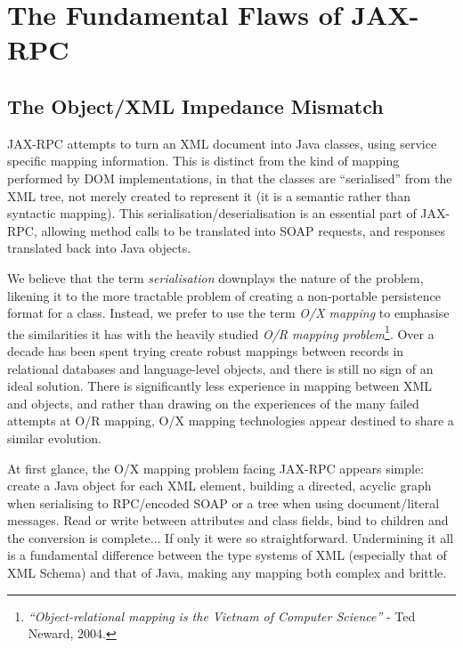 \section{The Fundamental Flaws of JAX-RPC}
\label{objections}

\subsection{The Object/XML Impedance Mismatch}
\label{objections:o-x}

JAX-RPC attempts to turn an XML document into Java classes, using
service specific mapping information. This is distinct from the kind
of mapping performed by DOM implementations, in that the classes are
``serialised'' from the XML tree, not merely created to represent it
(it is a semantic rather than syntactic mapping). This
serialisation/deserialisation is an essential part of JAX-RPC,
allowing method calls to be translated into SOAP requests, and
responses translated back into Java objects.

We believe that the term \emph{serialisation} downplays the nature of
the problem, likening it to the more tractable problem of creating a
non-portable persistence format for a class. Instead, we prefer to use
the term \emph{O/X mapping} to emphasise the similarities it has with
the heavily studied \emph{O/R mapping problem}\footnote{
\emph{``Object-relational mapping is the Vietnam of Computer Science''}
- Ted Neward, 2004.
}.  Over a decade has been spent trying create robust mappings between
records in relational databases and language-level objects, and there
is still no sign of an ideal solution. There is significantly less
experience in mapping between XML and objects, and rather than drawing
on the experiences of the many failed attempts at O/R mapping, O/X
mapping technologies appear destined to share a similar evolution.

At first glance, the O/X mapping problem facing JAX-RPC appears
simple: create a Java object for each XML element, building a
directed, acyclic graph when serialising to RPC/encoded SOAP or a tree
when using document/literal messages. Read or write between attributes
and class fields, bind to children and the conversion is
complete... If only it were so straightforward. Undermining it all is
a fundamental difference between the type systems of XML (especially
that of XML Schema) and that of Java, making any mapping both complex
and brittle.


